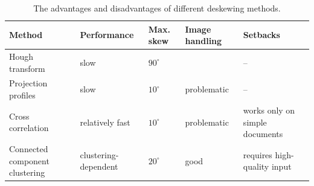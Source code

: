 \begin{table}[t]
\renewcommand{\arraystretch}{1.5}
{\footnotesize
\begin{tabular}{p{8em}p{7em}p{2.5em}p{6em}p{9em}}
\toprule
\textbf{Method} & \textbf{Performance} & \textbf{Max. skew} & \textbf{Image handling} & \textbf{Setbacks} \\
\midrule
Hough transform
&
slow
&
$90^{\circ}$
&

&
--
\\
Projection profiles
&
slow
&
$10^{\circ}$
&
problematic
&
--
\\
Cross correlation
&
relatively fast
&
$10^{\circ}$
&
problematic
&
works only on simple documents
\\
Connected component clustering
&
clustering-dependent
&
$20^{\circ}$
&
good
&
requires high-quality input
\\
\bottomrule
\end{tabular}
}
\caption{The advantages and disadvantages of different deskewing methods.}
\label{tab:preprocessSkewProsCons}
\end{table}

